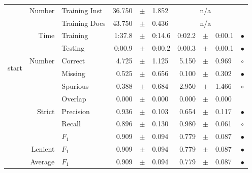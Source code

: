 \begin{longtable}{|r|r|l||rcl|rcl|c|}
\cline{2-10} & \multirow{2}{*}{    Number} &   Training Inst &      36.750 &  $\pm$  &       1.852 &    \multicolumn{3}{c|}{n/a}         &  \\
\cline{3-10} &                             &   Training Docs &      43.750 &  $\pm$  &       0.436 &    \multicolumn{3}{c|}{n/a}         &  \\
\cline{2-10} & \multirow{2}{*}{      Time} &        Training &      1:37.8 &  $\pm$  &      0:14.6 &      0:02.2 &  $\pm$  &      0:00.1 & $\bullet$ \\
\cline{3-10} &                             &         Testing &      0:00.9 &  $\pm$  &      0:00.2 &      0:00.3 &  $\pm$  &      0:00.1 & $\bullet$ \\
\hline
\hline
\multirow{11}{*}{\begin{sideways}start\end{sideways} }
             & \multirow{4}{*}{    Number} &         Correct &       4.725 &  $\pm$  &       1.125 &       5.150 &  $\pm$  &       0.969 & $\circ$ \\
\cline{3-10} &                             &         Missing &       0.525 &  $\pm$  &       0.656 &       0.100 &  $\pm$  &       0.302 & $\bullet$ \\
\cline{3-10} &                             &        Spurious &       0.388 &  $\pm$  &       0.684 &       2.950 &  $\pm$  &       1.466 & $\circ$ \\
\cline{3-10} &                             &         Overlap &       0.000 &  $\pm$  &       0.000 &       0.000 &  $\pm$  &       0.000 &  \\
\cline{2-10} & \multirow{3}{*}{    Strict} &       Precision &       0.936 &  $\pm$  &       0.103 &       0.654 &  $\pm$  &       0.117 & $\bullet$ \\
\cline{3-10} &                             &          Recall &       0.896 &  $\pm$  &       0.130 &       0.980 &  $\pm$  &       0.061 & $\circ$ \\
\cline{3-10} &                             &           $F_1$ &       0.909 &  $\pm$  &       0.094 &       0.779 &  $\pm$  &       0.087 & $\bullet$ \\
\cline{2-10} &                     Lenient &           $F_1$ &       0.909 &  $\pm$  &       0.094 &       0.779 &  $\pm$  &       0.087 & $\bullet$ \\
\cline{2-10} &                     Average &           $F_1$ &       0.909 &  $\pm$  &       0.094 &       0.779 &  $\pm$  &       0.087 & $\bullet$ \\

\end{longtable}
